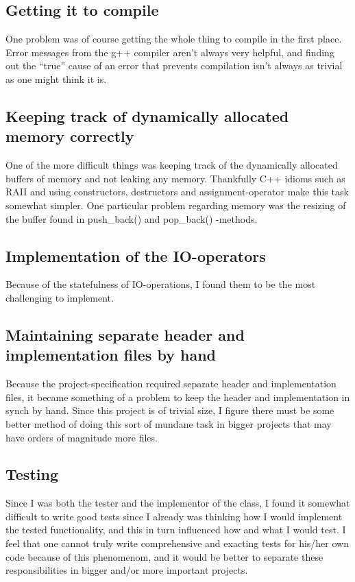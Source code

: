 \documentclass[11pt]{article}
\begin{document}
\subsection{Getting it to compile}

One problem was of course getting the whole thing to compile in the
first place. Error messages from the g++ compiler aren't always very helpful, and
finding out the ``true'' cause of an  error that prevents compilation
isn't always as trivial as one might think it is.

\subsection{Keeping track of dynamically allocated memory correctly}

One of the more difficult things was keeping track of the dynamically
allocated buffers of memory and not leaking any memory. Thankfully C++
idioms such as RAII and using constructors, destructors and
assignment-operator make this task somewhat simpler. One particular
problem regarding memory was the resizing of the buffer found in
push\_back() and pop\_back() -methods.

\subsection{Implementation of the IO-operators}

Because of the statefulness of IO-operations, I found them to be the
most challenging to implement. 

\subsection{Maintaining separate header and implementation files by hand}

Because the project-specification required separate header and
implementation files, it became something of a problem to keep the
header and implementation in synch by hand. Since this project is of
trivial size, I figure there must be some better method of doing this
sort of mundane task in bigger projects that may have orders of
magnitude more files. 

\subsection{Testing}

Since I was both the tester and the implementor of the class, I found
it somewhat difficult to write good tests since I already was thinking
how I would implement the tested functionality, and this in turn
influenced how and what I would test. I feel that one cannot truly
write comprehensive and exacting tests for his/her own code because of
this phenomenom, and it would be better to separate these
responsibilities in bigger and/or more important projects.
\end{document}
